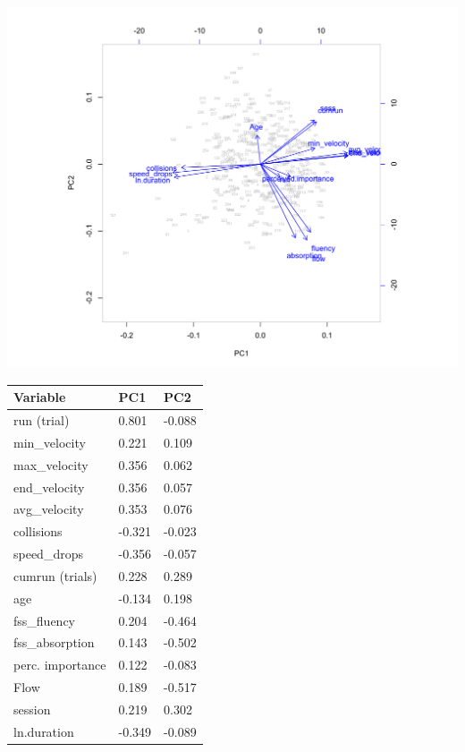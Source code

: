 \documentclass{article}
\begin{document}
\noindent
\begin{minipage}{\textwidth}
\begin{minipage}{.6\textwidth}
\centering
\includegraphics[width=\linewidth]{suppl4_pca}
\label{fig:supp_boxes}
\end{minipage}%
\begin{minipage}{.4\textwidth}
\begin{tabular}{lll}
{\bf Variable}   &{\bf PC1}&{\bf PC2}\\
\hline
run (trial)      & 0.801  & -0.088 \\
min\_velocity    & 0.221  & 0.109  \\
max\_velocity    & 0.356  & 0.062  \\
end\_velocity    & 0.356  & 0.057  \\
avg\_velocity    & 0.353  & 0.076  \\
collisions       & -0.321 & -0.023 \\
speed\_drops     & -0.356 & -0.057 \\
cumrun (trials)  & 0.228  & 0.289  \\
age              & -0.134 & 0.198  \\
fss\_fluency     & 0.204  & -0.464 \\
fss\_absorption  & 0.143  & -0.502 \\
perc. importance & 0.122  & -0.083 \\
Flow             & 0.189  & -0.517 \\
session          & 0.219  & 0.302  \\
ln.duration      & -0.349 & -0.089
\end{tabular}
\end{minipage}
\end{minipage}
\end{document}

